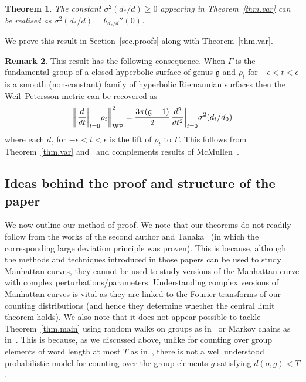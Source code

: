 \documentclass[10pt]{amsart}
\newtheorem{theo}{Theorem}[section]
\theoremstyle{definition}\newtheorem{defi}[theo]{Definition}\newtheorem{rema}[theo]{Remark}\newtheorem{exam}[theo]{Example}\newtheorem{exem}[theo]{Example}\newtheorem{nota}[theo]{Notation}
\newcommand{\G}{\Gamma}
\newcommand{\fkg}{\mathfrak{g}}
\let\originalleft\left
\let\originalright\right
\renewcommand{\left}{\mathopen{}\mathclose\bgroup\originalleft}
\renewcommand{\right}{\aftergroup\egroup\originalright}
\theoremstyle{plain}
\begin{document}
\begin{theo}\label{thm.var2}
The constant $\sigma^2(d_\ast/d) \ge 0$ appearing in Theorem~\ref{thm.var} can be realised as $\sigma^2(d_\ast/d) = \theta_{d_\ast/d}''(0)$.
\end{theo}

We prove this result in Section~\ref{sec.proofs} along with Theorem~\ref{thm.var}.
\begin{rema}
This result has the following consequence. When $\G$ is the fundamental group of a closed hyperbolic surface of genus $\fkg$ and $\rho_t$ for $-\epsilon < t < \epsilon$ is a smooth (non-constant) family of hyperbolic Riemannian surfaces then the Weil--Petersson metric can be recovered as
\[
\left\|\left.\frac{d}{dt}\right|_{t=0} \rho_t\right\|^2_{\text{WP}} = \frac{3\pi(\fkg-1)}{2}\left.\frac{d^2}{dt^2}\right|_{t=0} \sigma^2(d_t/d_0)
\]
where each $d_t$ for $-\epsilon < t < \epsilon$ is the lift of $\rho_t$ to $\G$. This follows from Theorem~\ref{thm.var} and~\cite[Lemma~4.2]{sharp.pollicott.wp} and complements results of McMullen~\cite{mcmullen}.
\end{rema}

\subsection{Ideas behind the proof and structure of the paper}\label{sec.method}
We now outline our method of proof. We note that our theorems do not readily follow from the works of the second author and Tanaka~\cite{cantrell.tanaka.2,cantrell.tanaka.1} (in which the corresponding large deviation principle was proven). This is because, although the methods and techniques introduced in those papers can be used to study Manhattan curves, they cannot be used to study versions of the Manhattan curve with complex perturbations/parameters. Understanding complex versions of Manhattan curves is vital as they are linked to the Fourier transforms of our counting distributions (and hence they determine whether the central limit theorem holds). We also note that it does not appear possible to tackle Theorem~\ref{thm.main} using random walks on groups as in~\cite{GTT} or Markov chains as in~\cite{cantrell.sert}. This is because, as we discussed above, unlike for counting over group elements of word length at most $T$ as in~\cite{cantrell.sert,GTT}, there is not a well understood probabilistic model for counting over the group elements $g$ satisfying $d(o,g) < T$.
\end{document}
